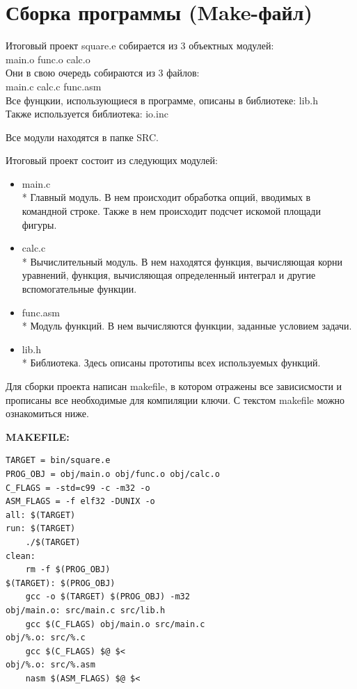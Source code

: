 \documentclass[a4paper,12pt,titlepage,finall]{article}
\begin{document}

\newpage

\section{Сборка программы (Make-файл)}
Итоговый проект square.e собирается из 3 объектных модулей: \\ 
main.o func.o calc.o \\
Они в свою очередь собираются из 3 файлов: \\
main.c calc.c func.asm \\
Все фунцкии, использующиеся в программе, описаны в библиотеке: lib.h \\
Также используется библиотека: io.inc

Все модули находятся в папке \textsc{SRC}.

Итоговый проект состоит из следующих модулей:
\begin{itemize}
    \item main.c
    \\* Главный модуль. В нем происходит обработка опций, вводимых в командной строке. Также в нем происходит подсчет искомой площади фигуры.
    \item calc.c
    \\* Вычислительный модуль. В нем находятся функция, вычисляющая корни уравнений, функция, вычисляющая определенный интеграл и другие вспомогательные функции.
    \item func.asm
    \\* Модуль функций. В нем вычисляются функции, заданные условием задачи.
    \item lib.h
    \\* Библиотека. Здесь описаны прототипы всех используемых функций.
\end{itemize}

Для сборки проекта написан makefile, в котором отражены все зависисмости и прописаны все необходимые для компиляции ключи. С текстом makefile можно ознакомиться ниже.

\textbf{MAKEFILE:}
\begin{verbatim}
TARGET = bin/square.e
PROG_OBJ = obj/main.o obj/func.o obj/calc.o
C_FLAGS = -std=c99 -c -m32 -o
ASM_FLAGS = -f elf32 -DUNIX -o
all: $(TARGET)
run: $(TARGET)
	./$(TARGET)
clean:
	rm -f $(PROG_OBJ)
$(TARGET): $(PROG_OBJ)
	gcc -o $(TARGET) $(PROG_OBJ) -m32
obj/main.o: src/main.c src/lib.h
	gcc $(C_FLAGS) obj/main.o src/main.c
obj/%.o: src/%.c
	gcc $(C_FLAGS) $@ $<
obj/%.o: src/%.asm
	nasm $(ASM_FLAGS) $@ $<
\end{verbatim}
\end{document}
